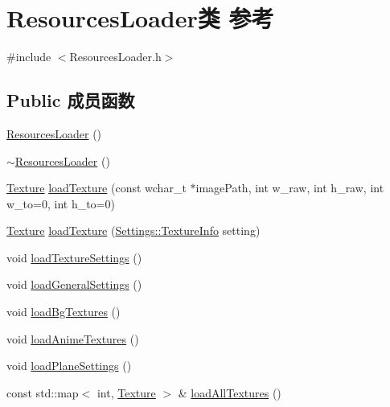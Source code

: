 \hypertarget{class_resources_loader}{}\section{Resources\+Loader类 参考}
\label{class_resources_loader}


{\ttfamily \#include $<$Resources\+Loader.\+h$>$}

\subsection*{Public 成员函数}
\begin{DoxyCompactItemize}
\item 
\hyperlink{class_resources_loader_a571b6232d8f1dc1cf94ec752c984a834}{Resources\+Loader} ()
\item 
\hyperlink{class_resources_loader_ab4f7fa273471e91107896131bce915da}{$\sim$\+Resources\+Loader} ()
\item 
\hyperlink{struct_texture}{Texture} \hyperlink{class_resources_loader_a38cbe5a4029c4a6fe999a8405703fc30}{load\+Texture} (const wchar\+\_\+t $\ast$image\+Path, int w\+\_\+raw, int h\+\_\+raw, int w\+\_\+to=0, int h\+\_\+to=0)
\item 
\hyperlink{struct_texture}{Texture} \hyperlink{class_resources_loader_a29b4b9fedb76dc01abcfacc2b31cf25c}{load\+Texture} (\hyperlink{struct_settings_1_1_texture_info}{Settings\+::\+Texture\+Info} setting)
\item 
void \hyperlink{class_resources_loader_a80e1d1bb8339e48b0becf401f205436e}{load\+Texture\+Settings} ()
\item 
void \hyperlink{class_resources_loader_aae8a0b49efa4191ba01cc832c32dbd95}{load\+General\+Settings} ()
\item 
void \hyperlink{class_resources_loader_a5099528fcfd109b389965e5ebfbdb661}{load\+Bg\+Textures} ()
\item 
void \hyperlink{class_resources_loader_afd356d180bfc92e6135996b3d290d3ae}{load\+Anime\+Textures} ()
\item 
void \hyperlink{class_resources_loader_a56b70b8ad03c9fde2736d425adfd97e7}{load\+Plane\+Settings} ()
\item 
const std\+::map$<$ int, \hyperlink{struct_texture}{Texture} $>$ \& \hyperlink{class_resources_loader_afe684ff2f1419210e4bbd608c67ffeb3}{load\+All\+Textures} ()
\end{DoxyCompactItemize}
